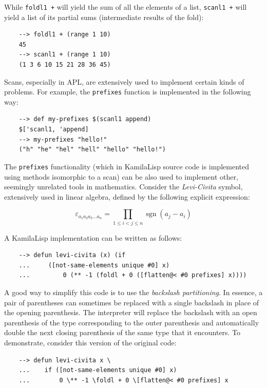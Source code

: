 While \verb|foldl1 +| will yield the sum of all the elements of a list, \verb|scanl1 +| will yield a list of its partial sums (intermediate results of the fold):

\begin{Verbatim}
    --> foldl1 + (range 1 10)
    45
    --> scanl1 + (range 1 10)
    (1 3 6 10 15 21 28 36 45)
\end{Verbatim}

Scans, especially in APL, are extensively used to implement certain kinds of problems. For example, the \verb|prefixes| function is implemented in the following way:

\begin{Verbatim}
    --> def my-prefixes $(scanl1 append)
    $['scanl1, 'append]
    --> my-prefixes "hello!"
    ("h" "he" "hel" "hell" "hello" "hello!")
\end{Verbatim}

The \verb|prefixes| functionality (which in KamilaLisp source code is implemented using methods isomorphic to a scan) can be also used to implement other, seemingly unrelated tools in mathematics. Consider the \textit{Levi-Civita} symbol, extensively used in linear algebra, defined by the following explicit expression:

$$
{\displaystyle \varepsilon _{a_{1}a_{2}a_{3}\ldots a_{n}}=\prod _{1\leq i<j\leq n}\operatorname {sgn}(a_{j}-a_{i})}
$$

A KamilaLisp implementation can be written as follows:

\begin{Verbatim}
    --> defun levi-civita (x) (if
    ...     ([not-same-elements unique #0] x)
    ...         0 (** -1 (foldl + 0 ([flatten@< #0 prefixes] x))))
\end{Verbatim}

A good way to simplify this code is to use the \textit{backslash partitioning}. In essence, a pair of parentheses can sometimes be replaced with a single backslash in place of the opening parenthesis. The interpreter will replace the backslash with an open parenthesis of the type corresponding to the outer parenthesis and automatically double the next closing parenthesis of the same type that it encounters. To demonstrate, consider this version of the original code:

\begin{Verbatim}
    --> defun levi-civita x \
    ...    if ([not-same-elements unique #0] x)
    ...        0 \** -1 \foldl + 0 \[flatten@< #0 prefixes] x
\end{Verbatim}

